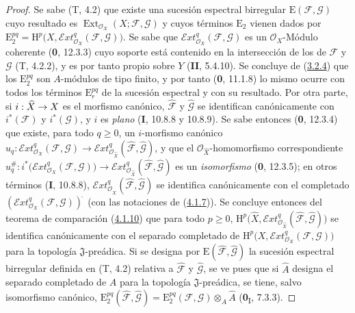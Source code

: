 \documentclass[10pt,oneside,openany]{book}
\theoremstyle{egaenv}\newtheorem*{env}{---}
\theoremstyle{egastatement}
\theoremstyle{egadescription}
\newcommand{\oldpage}[2][]{\marginnote{\normalfont\scriptsize\textbf{#1}\,|\,#2}\ignorespaces}
\renewcommand{\geq}{\geqslant}
\renewcommand{\to}{\mathchoice{\longrightarrow}{\rightarrow}{\rightarrow}{\rightarrow}}
\begin{document}
\begin{proof}
Se sabe (T, 4.2) que existe una sucesión espectral birregular
$\mathrm E(\mathcal F,\mathcal G)$ cuyo resultado es
$\operatorname{Ext}_{\mathcal O_X}(X;\mathcal F,\mathcal G)$ y cuyos términos
$\mathrm E_2$ vienen dados por
$\mathrm E_2^{pq}=\mathrm H^p\bigl(X,
\mathcal{E}\!xt^q_{\mathcal O_X}(\mathcal F,\mathcal G)\bigr)$.
Se sabe que $\mathcal{E}\!xt^q_{\mathcal O_X}(\mathcal F,\mathcal G)$ es un
$\mathcal O_X$-Módulo coherente (\textbf{0}, 12.3.3) cuyo soporte está contenido en
la intersección de los de $\mathcal F$ y $\mathcal G$ (T, 4.2.2), y es
por tanto propio sobre $Y$ (\textbf{II}, 5.4.10). Se concluye de
(\hyperref[III.3.2.4-fr]{3.2.4}) que los $\mathrm E_2^{pq}$ son
$A$-módulos de tipo finito, y por tanto (\textbf{0}, 11.1.8) lo mismo ocurre con todos
los términos $\mathrm E_r^{pq}$ de la sucesión espectral y con su resultado.
Por otra parte, si $i:\widehat X\to X$ es el morfismo canónico,
$\widehat{\mathcal F}$ y $\widehat{\mathcal G}$ se identifican canónicamente
con $i^*(\mathcal F)$ y $i^*(\mathcal G)$, y $i$ es \emph{plano} (\textbf{I}, 10.8.8 y
10.8.9). Se sabe entonces (\textbf{0}, 12.3.4) que existe, para todo $q\geq0$, un
$i$-morfismo canónico
$u_q:\mathcal{E}\!xt^q_{\mathcal O_X}(\mathcal F,\mathcal G)
\longrightarrow
\mathcal{E}\!xt^q_{\mathcal O_{\widehat X}}
(\widehat{\mathcal F},\widehat{\mathcal G})$,
y que el $\mathcal O_{\widehat X}$-homomorfismo correspondiente
$u_q^\#:i^*\bigl(\mathcal{E}\!xt^q_{\mathcal O_X}(\mathcal F,\mathcal G)\bigr)
\longrightarrow
\mathcal{E}\!xt^q_{\mathcal O_{\widehat X}}
(\widehat{\mathcal F},\widehat{\mathcal G})$
es un \emph{isomorfismo} (\textbf{0}, 12.3.5); en otros términos (\textbf{I}, 10.8.8),
$\mathcal{E}\!xt^q_{\mathcal O_{\widehat X}}
(\widehat{\mathcal F},\widehat{\mathcal G})$ se identifica canónicamente con el
completado $(\mathcal{E}\!xt^q_{\mathcal O_X}(\mathcal F,\mathcal G))^{\widehat{\,}}$ (con las
notaciones de (\hyperref[III.4.1.7-fr]{4.1.7})). Se concluye entonces del teorema de
comparación (\hyperref[III.4.1.10-fr]{4.1.10}) que para todo $p\geq0$,
$\mathrm H^p\bigl(\widehat X,
\mathcal{E}\!xt^q_{\mathcal O_{\widehat X}}
(\widehat{\mathcal F},\widehat{\mathcal G})\bigr)$
se identifica canónicamente con el separado completado
\oldpage[III]{139}
de
$\mathrm H^p\bigl(X,\mathcal{E}\!xt^q_{\mathcal O_X}
(\mathcal F,\mathcal G)\bigr)$ para la topología $\mathfrak J$-preádica.
Si se designa por $\mathrm E(\widehat{\mathcal F},
\widehat{\mathcal G})$ la sucesión espectral birregular definida en (T, 4.2)
relativa a $\widehat{\mathcal F}$ y $\widehat{\mathcal G}$, se ve pues que
si $\widehat A$ designa el separado completado de $A$ para la topología
$\mathfrak J$-preádica, se tiene, salvo isomorfismo canónico,
$\mathrm E_2^{pq}(\widehat{\mathcal F},\widehat{\mathcal G})
=\mathrm E_2^{pq}(\mathcal F,\mathcal G)\otimes_A\widehat A$
(\textbf{0}\textsubscript{I}, 7.3.3).


\end{proof}
\end{document}
